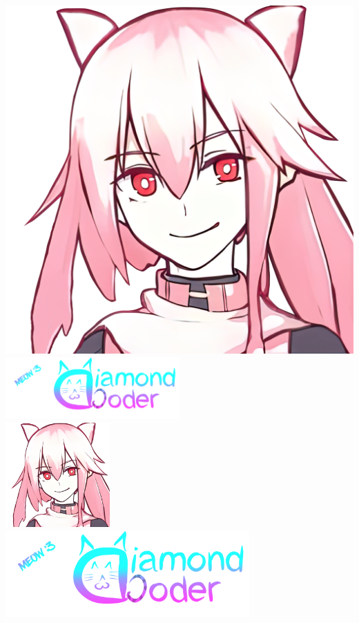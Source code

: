 \includegraphics[width=0.3\textheight]{Lily Femboy.png}\\
\includegraphics[width=0.5\textwidth]{DC Banner.png}\\
\includegraphics[width=0.3\textwidth,angle=30]{Lily Femboy.png}\\
\includegraphics[width=0.7\textwidth,trim=100 200 0 0, clip]{DC Banner.png}\\
